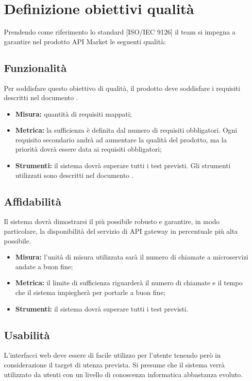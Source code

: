 \newpage
\section{Definizione obiettivi qualità}
	
	Prendendo come riferimento lo standard [ISO/IEC 9126] il team si impegna a
	garantire nel prodotto API Market le seguenti qualità:
	
	\subsection{Funzionalità}
		Per soddisfare questo obiettivo di qualità, il prodotto deve soddisfare i requisiti descritti nel documento \AdR.  
		
		\begin{itemize}
			\item \textbf{Misura: }quantità di requisiti mappati;
			\item \textbf{Metrica: }la sufficienza è definita dal numero di requisiti obbligatori. Ogni requisito secondario andrà ad aumentare la qualità del prodotto, ma la priorità dovrà essere data ai requisiti obbligatori;
			\item \textbf{Strumenti: }il sistema dovrà superare tutti i test previsti. Gli strumenti utilizzati sono descritti nel documento \NdP.
			
		\end{itemize}
	
	\subsection{Affidabilità}
		Il sistema dovrà dimostrarsi il più possibile robusto e garantire, in modo particolare, la disponibilità del servizio di API gateway in percentuale più alta possibile. 
		
		\begin{itemize}
			\item \textbf{Misura: }l’unità di misura utilizzata sarà il numero di chiamate a microservizi andate a buon fine;
			\item \textbf{Metrica: }il limite di sufficienza riguarderà il numero di chiamate e il tempo che il sistema impiegherà per portarle a buon fine;
			\item \textbf{Strumenti: }il sistema dovrà superare tutti i test previsti.
			
		\end{itemize}
	
	\subsection{Usabilità}
		L’interfacci web deve essere di facile utilizzo per l’utente tenendo però in considerazione il target di utenza prevista. Si presume che il sistema verrà utilizzato da utenti con un livello di conoscenza informatica abbastanza evoluto. 
		
